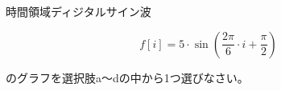 時間領域ディジタルサイン波 

\[
f[i] = 5 \cdot \sin \left ( \frac{2 \pi}{6} \cdot i  + \frac{\pi}{2} \right )
\]

\noindent のグラフを選択肢a〜dの中から1つ選びなさい。
